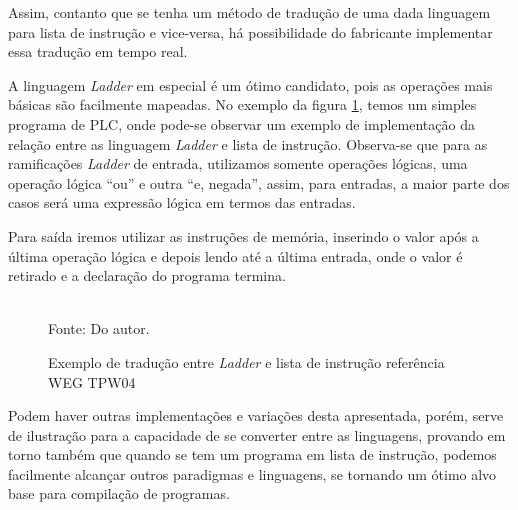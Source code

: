 Assim, contanto que se tenha um método de tradução de uma dada linguagem para lista de instrução e vice-versa, há possibilidade do fabricante implementar essa tradução em tempo real.

A linguagem \textit{Ladder} em especial é um ótimo candidato, pois as operações mais básicas são facilmente mapeadas. No exemplo da figura \ref{fig:illadder}, temos um simples programa de PLC, onde pode-se observar um exemplo de implementação da relação entre as linguagem \textit{Ladder} e lista de instrução. Observa-se que para as ramificações \textit{Ladder} de entrada, utilizamos somente operações lógicas, uma operação lógica ``ou'' e outra ``e, negada'', assim, para entradas, a maior parte dos casos será uma expressão lógica em termos das entradas.

Para saída iremos utilizar as instruções de memória, inserindo o valor após a última operação lógica e depois lendo até a última entrada, onde o valor é retirado e a declaração do programa termina.

\begin{figure}[ht]
	\centering
	\caption{Exemplo de tradução entre \textit{Ladder} e lista de instrução referência WEG TPW04}
	\\
	\label{fig:illadder}
	\footnotesize{Fonte: Do autor.}
\end{figure}

Podem haver outras implementações e variações desta apresentada, porém, serve de ilustração para a capacidade de se converter entre as linguagens, provando em torno também que quando se tem um programa em lista de instrução, podemos facilmente alcançar outros paradigmas e linguagens, se tornando um ótimo alvo base para compilação de programas.



